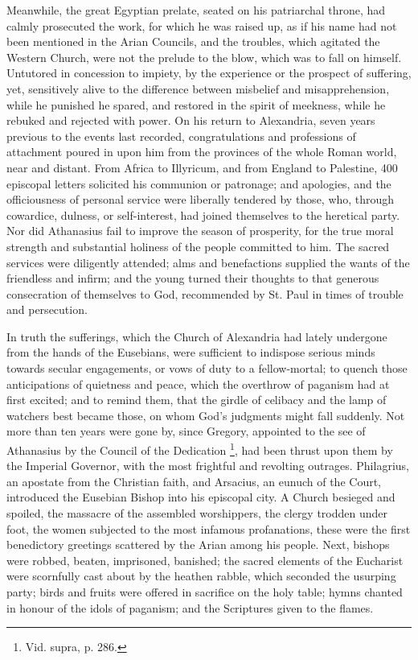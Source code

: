 Meanwhile, the great Egyptian prelate, seated on his patriarchal
throne, had calmly prosecuted the work, for which he was raised up, as
if his name had not been mentioned in the Arian Councils, and the
troubles, which agitated the Western Church, were not the prelude to
the blow, which was to fall on himself. Untutored in concession to
impiety, by the experience or the prospect of suffering, yet,
sensitively alive to the difference between misbelief and
misapprehension, while he punished he spared, and restored in the
spirit of meekness, while he rebuked and rejected with power. On his
return to Alexandria, seven years previous to the events last
recorded, congratulations and professions of attachment poured in upon
him from the provinces of the whole Roman world, near and distant.
From Africa to Illyricum, and from England to Palestine, 400
episcopal letters solicited his communion or patronage; and apologies,
and the officiousness of personal service were liberally tendered by
those, who, through cowardice, dulness, or self-interest, had joined
themselves to the heretical party. Nor did Athanasius fail to improve
the season of prosperity, for the true moral strength and substantial
holiness of the people committed to him. The sacred services were
diligently attended; alms and benefactions supplied the wants of the
friendless and infirm; and the young turned their thoughts to that
generous consecration of themselves to God, recommended by St. Paul in
times of trouble and persecution.

In truth the sufferings, which the Church of Alexandria had lately
undergone from the hands of the Eusebians, were sufficient to
indispose serious minds towards secular engagements, or vows of duty
to a fellow-mortal; to quench those anticipations of quietness and
peace, which the overthrow of paganism had at first excited; and to
remind them, that the girdle of celibacy and the lamp of watchers best
became those, on whom God's judgments might fall suddenly. Not more
than ten years were gone by, since Gregory, appointed to the see of
Athanasius by the Council of the Dedication \footnote{Vid. supra, p. 286.}, had been thrust upon them by the Imperial Governor, with the
most frightful and revolting outrages. Philagrius, an apostate from
the Christian faith, and Arsacius, an eunuch of the Court, introduced
the Eusebian Bishop into his episcopal city. A Church besieged and
spoiled, the massacre of the assembled worshippers, the clergy trodden
under foot, the women subjected to the most infamous profanations, these were the first benedictory greetings scattered by
the Arian among his people. Next, bishops were robbed, beaten,
imprisoned, banished; the sacred elements of the Eucharist were
scornfully cast about by the heathen rabble, which seconded the
usurping party; birds and fruits were offered in sacrifice on the holy
table; hymns chanted in honour of the idols of paganism; and the
Scriptures given to the flames.

